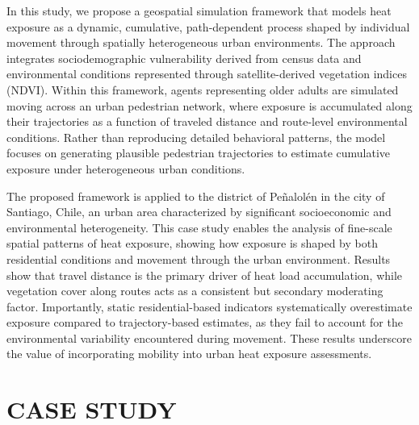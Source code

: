 \documentclass{wscpaperproc}
\theoremstyle{wsc}
\begin{document}
In this study, we propose a geospatial simulation framework that models heat exposure as a dynamic,  cumulative, path-dependent process shaped by individual movement through spatially heterogeneous urban environments. The approach integrates sociodemographic vulnerability derived from census data and environmental conditions represented through satellite-derived vegetation indices (NDVI). Within this framework, agents representing older adults are simulated moving across an urban pedestrian network, where exposure is accumulated along their trajectories as a function of traveled distance and route-level environmental conditions. Rather than reproducing detailed behavioral patterns, the model focuses on generating plausible pedestrian trajectories to estimate cumulative exposure under heterogeneous urban conditions.

The proposed framework is applied to the district of Peñalolén in the city of Santiago, Chile, an urban area characterized by significant socioeconomic and environmental heterogeneity. This case study enables the analysis of fine-scale spatial patterns of heat exposure, showing how exposure is shaped by both residential conditions and movement through the urban environment. 
Results show that travel distance is the primary driver of heat load accumulation, while vegetation cover along routes acts as a consistent but secondary moderating factor. Importantly, static residential-based indicators systematically overestimate exposure compared to trajectory-based estimates, as they fail to account for the environmental variability encountered during movement. These results underscore the value of incorporating mobility into urban heat exposure assessments.


\section{CASE STUDY}
\label{sec:data}
\end{document}
